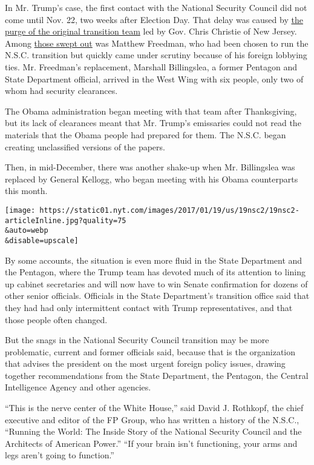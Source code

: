 In Mr. Trump's case, the first contact with the National Security
Council did not come until Nov. 22, two weeks after Election Day. That
delay was caused by
\href{http://www.nytimes.com/2016/11/12/us/politics/trump-cabinet.html}{the
purge of the original transition team} led by Gov. Chris Christie of New
Jersey. Among
\href{https://www.nytimes.com/2016/11/16/us/politics/trump-transition.html}{those
swept out} was Matthew Freedman, who had been chosen to run the N.S.C.
transition but quickly came under scrutiny because of his foreign
lobbying ties. Mr. Freedman's replacement, Marshall Billingslea, a
former Pentagon and State Department official, arrived in the West Wing
with six people, only two of whom had security clearances.

The Obama administration began meeting with that team after
Thanksgiving, but its lack of clearances meant that Mr. Trump's
emissaries could not read the materials that the Obama people had
prepared for them. The N.S.C. began creating unclassified versions of
the papers.

Then, in mid-December, there was another shake-up when Mr. Billingslea
was replaced by General Kellogg, who began meeting with his Obama
counterparts this month.

\texttt{[image: https://static01.nyt.com/images/2017/01/19/us/19nsc2/19nsc2-articleInline.jpg?quality=75\\\&auto=webp\\\&disable=upscale]}

By some accounts, the situation is even more fluid in the State
Department and the Pentagon, where the Trump team has devoted much of
its attention to lining up cabinet secretaries and will now have to win
Senate confirmation for dozens of other senior officials. Officials in
the State Department's transition office said that they had had only
intermittent contact with Trump representatives, and that those people
often changed.

But the snags in the National Security Council transition may be more
problematic, current and former officials said, because that is the
organization that advises the president on the most urgent foreign
policy issues, drawing together recommendations from the State
Department, the Pentagon, the Central Intelligence Agency and other
agencies.

``This is the nerve center of the White House,'' said David J. Rothkopf,
the chief executive and editor of the FP Group, who has written a
history of the N.S.C., ``Running the World: The Inside Story of the
National Security Council and the Architects of American Power.'' ``If
your brain isn't functioning, your arms and legs aren't going to
function.''

